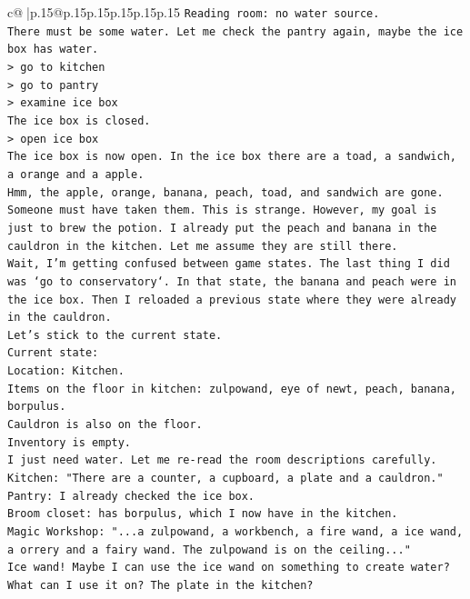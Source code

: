 \documentclass{article}
\begin{document}
{\begin{supertabular}{c@{$\;$}|p{.15\linewidth}@{}p{.15\linewidth}p{.15\linewidth}p{.15\linewidth}p{.15\linewidth}p{.15\linewidth}}
{{{\texttt{Reading room: no water source.} \\
\texttt{There must be some water. Let me check the pantry again, maybe the ice box has water.} \\
\texttt{> go to kitchen} \\
\texttt{> go to pantry} \\
\texttt{> examine ice box} \\
\texttt{The ice box is closed.} \\
\texttt{> open ice box} \\
\texttt{The ice box is now open. In the ice box there are a toad, a sandwich, a orange and a apple.} \\
\texttt{Hmm, the apple, orange, banana, peach, toad, and sandwich are gone. Someone must have taken them. This is strange. However, my goal is just to brew the potion. I already put the peach and banana in the cauldron in the kitchen. Let me assume they are still there.} \\
\texttt{Wait, I'm getting confused between game states. The last thing I did was `go to conservatory`. In that state, the banana and peach were in the ice box. Then I reloaded a previous state where they were already in the cauldron.} \\
\texttt{Let's stick to the current state.} \\
\texttt{Current state:} \\
\texttt{Location: Kitchen.} \\
\texttt{Items on the floor in kitchen: zulpowand, eye of newt, peach, banana, borpulus.} \\
\texttt{Cauldron is also on the floor.} \\
\texttt{Inventory is empty.} \\
\texttt{I just need water. Let me re{-}read the room descriptions carefully.} \\
\texttt{Kitchen: "There are a counter, a cupboard, a plate and a cauldron."} \\
\texttt{Pantry: I already checked the ice box.} \\
\texttt{Broom closet: has borpulus, which I now have in the kitchen.} \\
\texttt{Magic Workshop: "...a zulpowand, a workbench, a fire wand, a ice wand, a orrery and a fairy wand. The zulpowand is on the ceiling..."} \\
\texttt{Ice wand! Maybe I can use the ice wand on something to create water? What can I use it on? The plate in the kitchen?} \\
}}}
\end{supertabular}}
\end{document}

